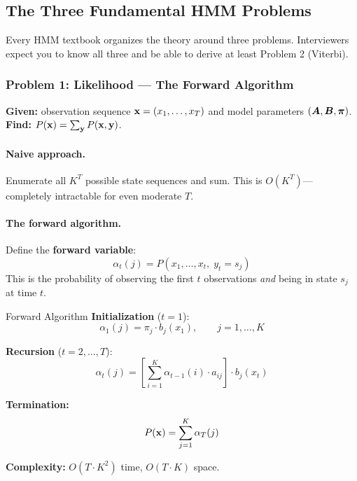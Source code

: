 \subsection{The Three Fundamental HMM Problems}

Every HMM textbook organizes the theory around three problems.  Interviewers
expect you to know all three and be able to derive at least Problem 2
(Viterbi).

\subsubsection{Problem 1: Likelihood --- The Forward Algorithm}

\textbf{Given:} observation sequence $\mathbf{x} = (x_1, \ldots, x_T)$ and model
parameters $(\bm{A}, \bm{B}, \bm{\pi})$.\\
\textbf{Find:} $P(\mathbf{x}) = \sum_{\mathbf{y}} P(\mathbf{x}, \mathbf{y})$.

\paragraph{Naive approach.}
Enumerate all $K^T$ possible state sequences and sum.  This is
$O(K^T)$---completely intractable for even moderate $T$.

\paragraph{The forward algorithm.}
Define the \textbf{forward variable}:
\[
\alpha_t(j) = P(x_1, \ldots, x_t,\; y_t = s_j)
\]
This is the probability of observing the first $t$ observations \emph{and}
being in state $s_j$ at time $t$.

\begin{mathresult}{Forward Algorithm}
\textbf{Initialization} ($t = 1$):
\begin{equation}
\alpha_1(j) = \pi_j \cdot b_j(x_1), \qquad j = 1, \ldots, K
\label{eq:forward_init}
\end{equation}

\textbf{Recursion} ($t = 2, \ldots, T$):
\begin{equation}
\alpha_t(j) = \left[\sum_{i=1}^{K} \alpha_{t-1}(i) \cdot a_{ij}\right] \cdot b_j(x_t)
\label{eq:forward_recursion}
\end{equation}

\textbf{Termination:}
\begin{equation}
P(\mathbf{x}) = \sum_{j=1}^{K} \alpha_T(j)
\label{eq:forward_termination}
\end{equation}

\textbf{Complexity:} $O(T \cdot K^2)$ time, $O(T \cdot K)$ space.
\end{mathresult}


